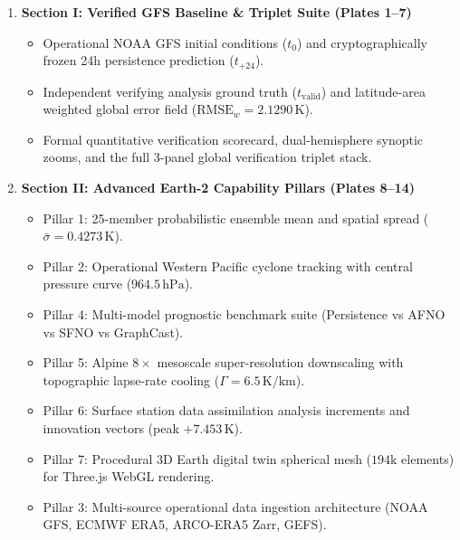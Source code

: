 \documentclass[11pt,a4paper]{article}
\begin{document}
\vspace{0.2cm}
\begin{tcolorbox}[colback=panelbg,colframe=panelborder,arc=2mm,title={\bfseries Thematic Visual Architecture (Part 1: Pillars \& 3D Series)},coltitle=navyblue]
\begin{enumerate}[leftmargin=*,noitemsep]
    \item \textbf{Section I: Verified GFS Baseline \& Triplet Suite (Plates 1--7)}
    \begin{itemize}[noitemsep]
        \item Operational NOAA GFS initial conditions ($t_0$) and cryptographically frozen 24h persistence prediction ($t_{+24}$).
        \item Independent verifying analysis ground truth ($t_\text{valid}$) and latitude-area weighted global error field ($\mathrm{RMSE}_w = 2.1290\,\text{K}$).
        \item Formal quantitative verification scorecard, dual-hemisphere synoptic zooms, and the full 3-panel global verification triplet stack.
    \end{itemize}
    \vspace{0.1cm}
    \item \textbf{Section II: Advanced Earth-2 Capability Pillars (Plates 8--14)}
    \begin{itemize}[noitemsep]
        \item Pillar 1: 25-member probabilistic ensemble mean and spatial spread ($\bar{\sigma} = 0.4273\,\text{K}$).
        \item Pillar 2: Operational Western Pacific cyclone tracking with central pressure curve ($964.5\,\text{hPa}$).
        \item Pillar 4: Multi-model prognostic benchmark suite (Persistence vs AFNO vs SFNO vs GraphCast).
        \item Pillar 5: Alpine $8\times$ mesoscale super-resolution downscaling with topographic lapse-rate cooling ($\Gamma = 6.5\,\text{K/km}$).
        \item Pillar 6: Surface station data assimilation analysis increments and innovation vectors (peak $+7.453\,\text{K}$).
        \item Pillar 7: Procedural 3D Earth digital twin spherical mesh ($194\text{k}$ elements) for Three.js WebGL rendering.
        \item Pillar 3: Multi-source operational data ingestion architecture (NOAA GFS, ECMWF ERA5, ARCO-ERA5 Zarr, GEFS).
    \end{itemize}

\end{enumerate}
\end{tcolorbox}
\end{document}

